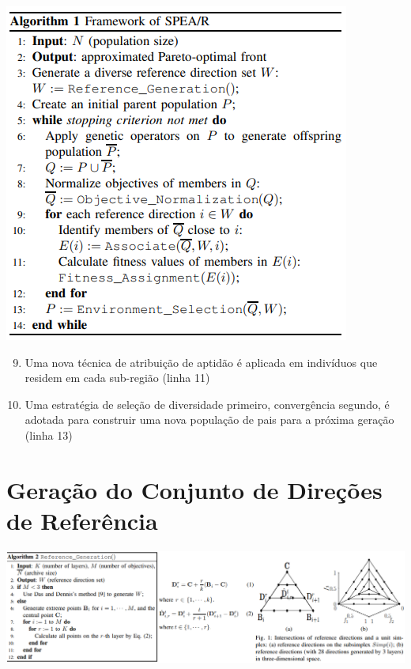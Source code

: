 \documentclass{rbfin}
\begin{document}
\begin{center}
\includegraphics[scale=1]{alg1}
\end{center}

\begin{enumerate}[label=(\arabic*), itemsep=0mm]
  \setcounter{enumi}{8}
  \item Uma nova técnica de atribuição de aptidão é aplicada em indivíduos que residem em cada sub-região (linha 11)
  \item Uma estratégia de seleção de diversidade primeiro, convergência segundo, é adotada para construir uma nova população de pais para a próxima geração (linha 13)
\end{enumerate}

\newpage
\section{Geração do Conjunto de Direções de Referência}
\singlespacing

\vspace{6mm}

\begin{center}
\includegraphics[scale=1.2]{alg2}
\end{center}
\end{document}
